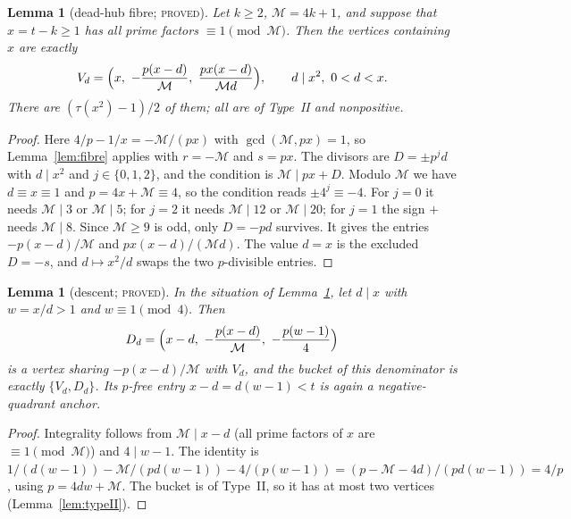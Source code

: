 \documentclass[11pt,reqno]{amsart}
\newtheorem{lemma}[theorem]{Lemma}
\theoremstyle{definition}
\newcommand{\status}[1]{\textsc{#1}}
\begin{document}
\begin{lemma}[dead-hub fibre; \status{proved}]\label{lem:B}
Let $k\ge2$, $\mathcal M=4k+1$, and suppose that $x=t-k\ge1$ has all prime
factors $\equiv1\pmod{\mathcal M}$.  Then the vertices containing $x$ are
exactly
\[
 V_d=\Bigl(x,\ -\frac{p(x-d)}{\mathcal M},\ \frac{px(x-d)}{\mathcal Md}\Bigr),
 \qquad d\mid x^2,\ 0<d<x .
\]
There are $(\tau(x^2)-1)/2$ of them; all are of Type~II and nonpositive.
\end{lemma}

\begin{proof}
Here $4/p-1/x=-\mathcal M/(px)$ with $\gcd(\mathcal M,px)=1$, so
Lemma~\ref{lem:fibre} applies with $r=-\mathcal M$ and $s=px$.  The
divisors are $D=\pm p^jd$ with $d\mid x^2$ and $j\in\{0,1,2\}$, and the
condition is $\mathcal M\mid px+D$.  Modulo $\mathcal M$ we have
$d\equiv x\equiv1$ and $p=4x+\mathcal M\equiv4$, so the condition reads
$\pm4^j\equiv-4$.  For $j=0$ it needs $\mathcal M\mid3$ or $\mathcal M\mid5$;
for $j=2$ it needs $\mathcal M\mid12$ or $\mathcal M\mid20$; for $j=1$ the
sign $+$ needs $\mathcal M\mid8$.  Since $\mathcal M\ge9$ is odd, only
$D=-pd$ survives.  It gives the entries $-p(x-d)/\mathcal M$ and
$px(x-d)/(\mathcal Md)$.  The value $d=x$ is the excluded $D=-s$, and
$d\mapsto x^2/d$ swaps the two $p$-divisible entries.
\end{proof}

\begin{lemma}[descent; \status{proved}]\label{lem:C}
In the situation of Lemma~\ref{lem:B}, let $d\mid x$ with $w=x/d>1$ and
$w\equiv1\pmod4$.  Then
\[
 D_d=\Bigl(x-d,\ -\frac{p(x-d)}{\mathcal M},\ -\frac{p(w-1)}{4}\Bigr)
\]
is a vertex sharing $-p(x-d)/\mathcal M$ with $V_d$, and the bucket of this
denominator is exactly $\{V_d,D_d\}$.  Its $p$-free entry
$x-d=d(w-1)<t$ is again a negative-quadrant anchor.
\end{lemma}

\begin{proof}
Integrality follows from $\mathcal M\mid x-d$ (all prime factors of $x$ are
$\equiv1\pmod{\mathcal M}$) and $4\mid w-1$.  The identity is
$1/(d(w-1))-\mathcal M/(pd(w-1))-4/(p(w-1))=(p-\mathcal M-4d)/(pd(w-1))=4/p$,
using $p=4dw+\mathcal M$.  The bucket is of Type~II, so it has at most two
vertices (Lemma~\ref{lem:typeII}).
\end{proof}
\end{document}
